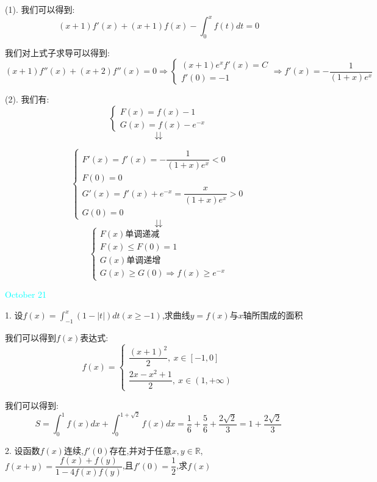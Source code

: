 \begin{solution}

	(1). 我们可以得到:  
	$$(x+1)f'(x)+(x+1)f(x)-\int_{0}^{x}f(t)dt=0$$
	
	我们对上式子求导可以得到:  
	$$(x+1)f''(x)+(x+2)f''(x)=0\Rightarrow \left\lbrace 
	\begin{array}{l}
		(x+1)e^{x}f'(x)=C\\
		f'(0)=-1
	\end{array}
	\right. \Rightarrow f'(x)=-\dfrac{1}{(1+x)e^{x}}$$
	
	(2). 我们有:  $$\left\lbrace 
	\begin{array}{l}
		F(x)=f(x)-1\\
		G(x)=f(x)-e^{-x}
	\end{array}
	\right.$$
	$$\downdownarrows$$ 
	
	$$\left\lbrace 
	\begin{array}{l}
		F'(x)=f'(x)=-\dfrac{1}{(1+x)e^{x}}<0\\
		F(0)=0\\
		G'(x)=f'(x)+e^{-x}=\dfrac{x}{(1+x)e^{x}}>0\\
		G(0)=0
	\end{array}
	\right.$$ 
	$$\downdownarrows$$ 
	$$\left\lbrace 
	\begin{array}{l}
		F(x)\text{单调递减}\\
		F(x)\leq F(0)=1\\
		G(x)\text{单调递增}\\
		G(x)\geq G(0)\Rightarrow f(x)\geq e^{-x}
	\end{array}
	\right. $$
\end{solution}


\textcolor{cyan}{October 21}

1. 设$f(x)=\int_{-1}^{x}(1-|t|)dt(x\geq -1)$,求曲线$y=f(x)$与$x$轴所围成的面积

\begin{solution}

	我们可以得到$f(x)$表达式:  
	$$f(x)=\left\lbrace 
	\begin{array}{l}
		\dfrac{(x+1)^2}{2},\ x\in[-1,0]\\
		\dfrac{2x-x^2+1}{2},\ x\in(1,+\infty)
	\end{array}
	\right. $$
	
	我们可以得到:  
	$$S=\int_{0}^{1}f(x)dx+\int_{0}^{1+\sqrt{2}}f(x)dx=\dfrac{1}{6}+\dfrac{5}{6}+\dfrac{2\sqrt{2}}{3}=1+\dfrac{2\sqrt{2}}{3}$$
\end{solution}


2. 设函数$f(x)$连续,$f'(0)$存在,并对于任意$x,y\in\mathbb{R}$,$f(x+y)=\dfrac{f(x)+f(y)}{1-4f(x)f(y)}$,且$f'(0)=\dfrac{1}{2}$,求$f(x)$


